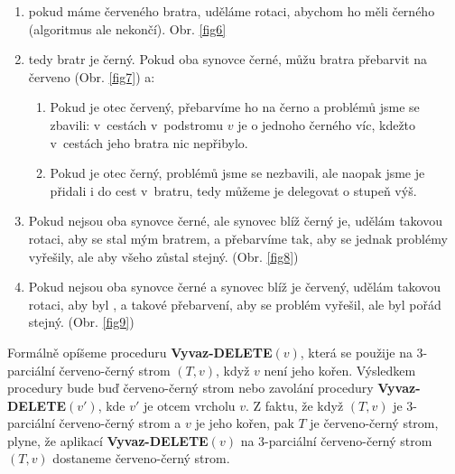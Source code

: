 \documentclass[a4paper,12pt]{article}
\begin{document}
\begin{enumerate}
    \item pokud máme červeného bratra, uděláme rotaci, abychom ho měli černého (algoritmus ale nekončí). Obr. \ref{fig6}
    \item tedy bratr je černý. Pokud oba synovce černé, můžu bratra přebarvit na červeno (Obr. \ref{fig7}) a:
    \begin{enumerate}
        \item Pokud je otec červený, přebarvíme ho na černo a problémů jsme se zbavili: v~cestách v~podstromu $v$ je o jednoho černého víc, kdežto v~cestách jeho bratra nic nepřibylo.
        \item Pokud je otec černý, problémů jsme se nezbavili, ale naopak jsme je přidali i do cest v~bratru, tedy můžeme je delegovat o stupeň výš.
    \end{enumerate}
    \item Pokud nejsou oba synovce černé, ale synovec blíž  černý je, udělám takovou rotaci, aby se stal mým bratrem, a přebarvíme tak, aby se jednak problémy vyřešily, ale aby  všeho zůstal stejný. (Obr. \ref{fig8})
    \item Pokud nejsou oba synovce černé a synovec blíž  je červený, udělám takovou rotaci, aby byl , a takové přebarvení, aby se problém vyřešil, ale  byl pořád stejný. (Obr. \ref{fig9})
\end{enumerate}


Formálně opíšeme proceduru {\bf Vyvaz-DELETE$(v)$}, která se 
použije na 3-parciální červeno-černý strom $(T,v)$, když $
v$ není jeho 
kořen.  Výsledkem procedury bude buď červeno-černý strom 
nebo zavolání procedury {\bf Vyvaz-DELE\-TE$(v')$}, kde $v'$ je otcem 
vrcholu $v$.  Z faktu, že když $(T,v)$ je 3-parciální červeno-černý 
strom a $v$ je jeho kořen, pak $T$ je červeno-černý strom, plyne, 
že aplikací {\bf Vyvaz-DELETE$(v)$} na 3-parciální červeno-černý strom 
$(T,v)$ dostaneme červeno-černý strom.  
\end{document}
